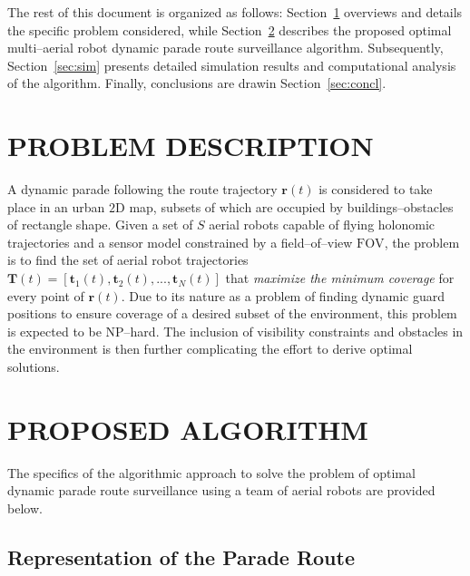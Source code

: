 \documentclass[letterpaper, 10 pt, conference]{ieeeconf}  %
\begin{document}
The rest of this document is organized as follows: Section~\ref{sec:problem} overviews and details the specific problem considered, while Section~\ref{sec:algorithm} describes the proposed optimal multi--aerial robot dynamic parade route surveillance algorithm. Subsequently, Section~\ref{sec:sim} presents detailed simulation results and computational analysis of the algorithm. Finally, conclusions are drawin Section~\ref{sec:concl}.

\section{PROBLEM DESCRIPTION}\label{sec:problem}

A dynamic parade following the route trajectory $\mathbf{r}(t)$ is considered to take place in an urban $2\textrm{D}$ map, subsets of which are occupied by buildings--obstacles of rectangle shape. Given a set of $S$ aerial robots capable of flying holonomic trajectories and a sensor model constrained by a field--of--view $\textrm{FOV}$, the problem is to find the set of aerial robot trajectories $\mathbf{T}(t) = [\mathbf{t}_1(t),\mathbf{t}_2(t),...,\mathbf{t}_N(t)]$ that \emph{maximize the minimum coverage} for every point of $\mathbf{r}(t)$. Due to its nature as a problem of finding dynamic guard positions to ensure coverage of a desired subset of the environment, this problem is expected to be NP--hard. The inclusion of visibility constraints and obstacles in the environment is then further complicating the effort to derive optimal solutions.



\section{PROPOSED ALGORITHM}\label{sec:algorithm}

The specifics of the algorithmic approach to solve the problem of optimal dynamic parade route surveillance using a team of aerial robots are provided below.

\subsection{Representation of the Parade Route}
\end{document}
